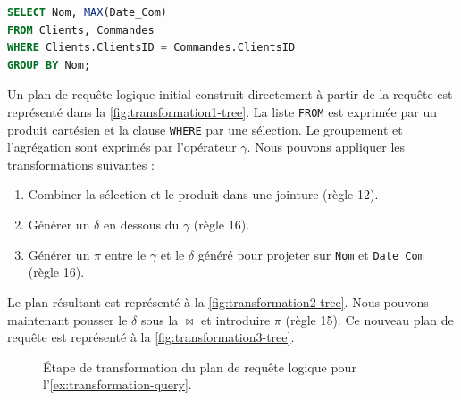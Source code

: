 \begin{lstlisting}[language=Sql]
SELECT Nom, MAX(Date_Com)
FROM Clients, Commandes
WHERE Clients.ClientsID = Commandes.ClientsID
GROUP BY Nom;
\end{lstlisting}

Un plan de requête logique initial construit directement à partir de la requête est représenté dans la \ref{fig:transformation1-tree}. La liste \texttt{FROM} est exprimée par un produit cartésien et la clause \texttt{WHERE} par une sélection. Le groupement et l'agrégation sont exprimés par l'opérateur $\gamma$. Nous pouvons appliquer les transformations suivantes :
\begin{enumerate}
 \item Combiner la sélection et le produit dans une jointure (règle 12).
 \item Générer un $\delta$ en dessous du $\gamma$ (règle 16).
 \item Générer un $\pi$ entre le $\gamma$ et le $\delta$ généré pour projeter sur \texttt{Nom} et \texttt{Date\_Com} (règle 16).
\end{enumerate}
Le plan résultant est représenté à la \ref{fig:transformation2-tree}. Nous pouvons maintenant pousser le $\delta$ sous la $\bowtie$ et introduire $\pi$ (règle 15). Ce nouveau plan de requête est représenté à la \ref{fig:transformation3-tree}. 

\begin{figure}
  \centering
  \small
  \quad
  \quad
  \caption{Étape de transformation du plan de requête logique pour l'\ref{ex:transformation-query}.}\label{fig:transformation-tree}
\end{figure}

